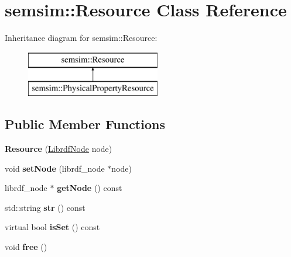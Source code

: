 \hypertarget{classsemsim_1_1Resource}{}\section{semsim\+:\+:Resource Class Reference}
\label{classsemsim_1_1Resource}
Inheritance diagram for semsim\+:\+:Resource\+:\begin{figure}[H]
\begin{center}
\leavevmode
\includegraphics[height=2.000000cm]{classsemsim_1_1Resource}
\end{center}
\end{figure}
\subsection*{Public Member Functions}
\begin{DoxyCompactItemize}
\item 
\mbox{\label{classsemsim_1_1Resource_ab612b7a2a84228777da4c101ad02b619}} 
{\bfseries Resource} (\hyperlink{classredland_1_1LibrdfNode}{Librdf\+Node} node)
\item 
\mbox{\label{classsemsim_1_1Resource_a759e8efd88775fe1a32d01671083fc0c}} 
void {\bfseries set\+Node} (librdf\+\_\+node $\ast$node)
\item 
\mbox{\label{classsemsim_1_1Resource_ab90831395bf440a6ab4c14cec8398e03}} 
librdf\+\_\+node $\ast$ {\bfseries get\+Node} () const
\item 
\mbox{\label{classsemsim_1_1Resource_ac762aa68f78bb750d71f4b109395dcfd}} 
std\+::string {\bfseries str} () const
\item 
\mbox{\label{classsemsim_1_1Resource_a46e7e3a2b53852994f689685bb3df555}} 
virtual bool {\bfseries is\+Set} () const
\item 
\mbox{\label{classsemsim_1_1Resource_a500cd732b16e141d514456d36f3307e5}} 
void {\bfseries free} ()
\end{DoxyCompactItemize}

